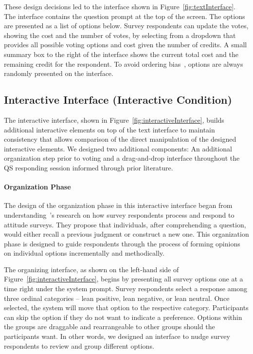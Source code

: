 These design decisions led to the interface shown in Figure~\ref{fig:textInterface}. The interface contains the question prompt at the top of the screen. The options are presented as a list of options below. Survey respondents can update the votes, showing the cost and the number of votes, by selecting from a dropdown that provides all possible voting options and cost given the number of credits. A small summary box to the right of the interface shows the current total cost and the remaining credit for the respondent. To avoid ordering bias~\cite{ferberOrderBiasMail1952, couperWebSurveyDesign2001}, options are always randomly presented on the interface.

\subsection{Interactive Interface (Interactive Condition)}
The interactive interface, shown in Figure~\ref{fig:interactiveInterface}, builds additional interactive elements on top of the text interface to maintain consistency that allows comparison of the direct manipulation of the designed interactive elements. We designed two additional components: An additional organization step prior to voting and a drag-and-drop interface throughout the QS responding session informed through prior literature.

\paragraph{Organization Phase}


The design of the organization phase in this interactive interface began from understanding~\textcite{strackThinkingJudgingCommunicating1987}'s research on how survey respondents process and respond to attitude surveys. They propose that individuals, after comprehending a question, would either recall a previous judgment or construct a new one. This organization phase is designed to guide respondents through the process of forming opinions on individual options incrementally and methodically.

The organizing interface, as shown on the left-hand side of Figure~\ref{fig:interactiveInterface}, begins by presenting all survey options one at a time right under the system prompt. Survey respondents select a response among three ordinal categories -- lean positive, lean negative, or lean neutral. Once selected, the system will move that option to the respective category. Participants can skip the option if they do not want to indicate a preference. Options within the groups are draggable and rearrangeable to other groups should the participants want. In other words, we designed an interface to nudge survey respondents to review and group different options.

